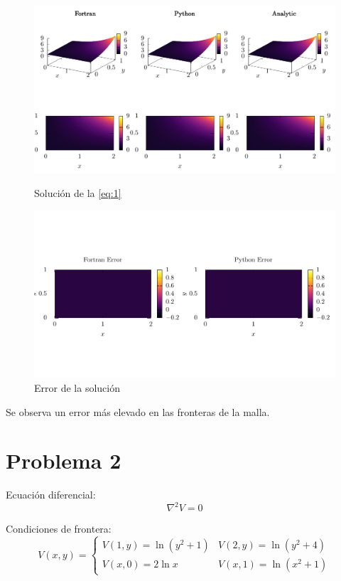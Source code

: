 \documentclass[12pt,a4paper]{article}
\begin{document}
\begin{figure}[H]
  \centering
  \includegraphics[width=\textwidth]{./comparison-01.pdf}
  \caption{Solución de la \cref{eq:1}}
  \includegraphics[width=\textwidth]{./error-01.pdf}
  \caption{Error de la solución}
\end{figure}

Se observa un error más elevado en las fronteras de la malla.

\newpage

\section*{Problema 2}%
\label{sec:Problema 2}

Ecuación diferencial:
\begin{equation}
  \nabla^2{V} = 0
  \label{eq:2}
\end{equation}

Condiciones de frontera:
\begin{equation}
  V(x, y) =
  \begin{cases}
    V(1, y) = \ln{\left(y^2 + 1\right)} & V(2, y) = \ln{\left(y^2 + 4\right)} \\
    V(x, 0) = 2 \ln{x} & V(x, 1) = \ln{\left(x^2 + 1\right)}
  \end{cases}
\end{equation}
\end{document}
